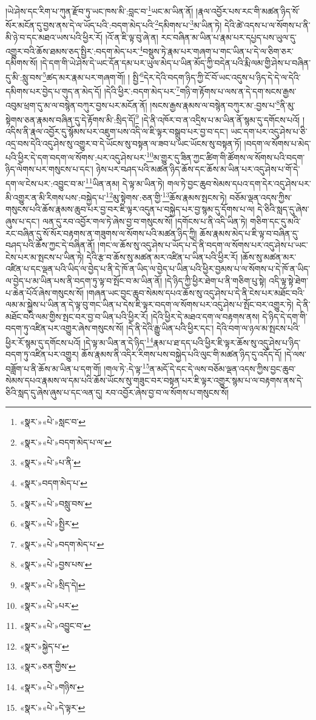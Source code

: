 །ཡེ་ཤེས་དང་རིག་པ་ཀུན་རྫོབ་ཏུ་ཡང་ཁས་མི་:བླང་བ་\footnote{«སྣར་»«པེ་»སླང་བ་}ཡང་མ་ཡིན་ནོ། །རྣལ་འབྱོར་པས་རང་གི་མཚན་ཉིད་སོ་སོར་མངོན་དུ་བྱས་ནས་དེ་ལ་ཡོད་པའི་:བདག་མེད་པའི་\footnote{«སྣར་»«པེ་»བདག་མེད་པ་ལ་}དམིགས་པ་\footnote{«སྣར་»«པེ་»པ་ནི་}མ་ཡིན་ཏེ། དེའི་ཚེ་འདས་པ་ལ་སོགས་པ་ནི་མི་ཉེ་བ་དང་མཐའ་ཡས་པའི་ཕྱིར་རོ། །འོ་ན་ཇི་ལྟ་བུ་ཞེ་ན། རང་བཞིན་མ་ཡིན་པ་རྣམ་པར་དཔྱད་པས་ཡུལ་དུ་འགྱུར་བའི་ཆོས་ཐམས་ཅད་སྤྱིར་:བདག་མེད་པར་\footnote{«སྣར་»བདག་མེད་པ་}བསྡུས་ཏེ་རྣམ་པར་གཞག་པ་གང་ཡིན་པ་དེ་ལ་ཅིག་ཅར་དམིགས་སོ། །དེ་དག་གི་ཡེ་ཤེས་དེ་ཡང་དོན་དམ་པར་ཡུལ་མེད་པ་ཡིན་མོད་ཀྱི་བདེན་པའི་རྨི་ལམ་གྱི་ཤེས་པ་བཞིན་དུ་མི་:སླུ་བས་\footnote{«སྣར་»«པེ་»བསླུ་བས་}ཚད་མར་རྣམ་པར་གཞག་གོ། །
སྤྱི་\footnote{«སྣར་»«པེ་»སྤྱིར་}དེར་དེའི་བདག་ཉིད་ཀྱི་ངོ་བོ་ཡང་འདུས་པ་ཉིད་དེ་དེ་ལ་དེའི་དམིགས་པར་བྱེད་པ་གུད་ན་མེད་དོ། །དེའི་ཕྱིར་:བདག་མེད་པར་\footnote{«སྣར་»«པེ་»བདག་མེད་པ་}གཉི་ག་རྟོགས་པ་ལས་ན་དེ་དག་སངས་རྒྱས་འབུམ་ཕྲག་དུ་མ་ལ་བསྙེན་བཀུར་བྱས་པར་མངོན་ནོ། །སངས་རྒྱས་རྣམས་ལ་བསྙེན་བཀུར་མ་:བྱས་པ་\footnote{«སྣར་»«པེ་»བྱས་པས་}ནི་མུ་སྟེགས་ཅན་རྣམས་བཞིན་དུ་དེ་རྟོགས་མི་:སྲིད་དོ།\footnote{«སྣར་»«པེ་»སྲིད་དེ།} །དེ་ནི་འཁོར་བ་ན་འདྲིས་པ་མ་ཡིན་ནོ་སྙམ་དུ་དགོངས་པའོ། །འདིས་ནི་རྣལ་འབྱོར་དུ་སྙོམས་པར་འཇུག་པས་འདི་ལ་ཇི་ལྟར་བསྒྲུབ་པར་བྱ་བ་དང་། ཡང་དག་པར་འདུ་ཤེས་པ་ཅི་འདྲ་བས་དེའི་འདུ་ཤེས་སུ་འགྱུར་བ་དེ་ཡོངས་སུ་བསྟན་ལ་ཟབ་པ་ཡང་ཡོངས་སུ་བསྟན་ཏོ། །བདག་ལ་སོགས་པ་མེད་པའི་ཕྱིར་དེ་དག་བདག་ལ་སོགས་:པར་འདུ་ཤེས་པར་\footnote{«སྣར་»«པེ་»པར་}མ་གྱུར་དུ་ཟིན་ཀྱང་ཚིག་གི་ཚོགས་ལ་སོགས་པའི་བདག་ཉིད་ལེགས་པར་གསུངས་པ་དང་། ཉེས་པར་བཤད་པའི་མཚན་ཉིད་ཆོས་དང་ཆོས་མ་ཡིན་པར་འདུ་ཤེས་པ་གོ་དེ་དག་ལ་ངེས་པར་:འབྱུང་བ་མ་\footnote{«སྣར་»«པེ་»འབྱུང་བ་}ཡིན་ནམ། དེ་ལྟ་མ་ཡིན་ཏེ། གལ་ཏེ་བྱང་ཆུབ་སེམས་དཔའ་དག་དེར་འདུ་ཤེས་པར་མི་འགྱུར་ན་མི་རིགས་པས་:བསྐྱེད་པ་\footnote{«སྣར་»སྐྱེད་པ་}མུ་སྟེགས་:ཅན་གྱི་\footnote{«སྣར་»ཅན་གྱིས་}ཆོས་རྣམས་སྤངས་ཏེ། བཅོམ་ལྡན་འདས་ཀྱིས་གསུངས་པའི་ཆོས་རྣམས་ཆུབ་པར་བྱ་བར་ཇི་ལྟར་འདུན་པ་བསྐྱེད་པར་བྱ་སྙམ་དུ་དོགས་པ་ལ། དེ་ཅིའི་སླད་དུ་ཞེས་ཞུས་པ་དང་། ལན་དུ་རབ་འབྱོར་གལ་ཏེ་ཞེས་བྱ་བ་གསུངས་སོ། །དགོངས་པ་ནི་འདི་ཡིན་ཏེ། གཅིག་དང་དུ་མའི་རང་བཞིན་དུ་སོ་སོར་བརྟགས་ན་གཟུགས་ལ་སོགས་པའི་མཚན་ཉིད་ཀྱི། ཆོས་རྣམས་མེད་པ་ཇི་ལྟ་བ་བཞིན་དུ་བཤད་པའི་ཆོས་ཀྱང་དེ་བཞིན་ནོ། །གང་ལ་ཆོས་སུ་འདུ་ཤེས་པ་ཡོད་པ་དེ་ནི་བདག་ལ་སོགས་པར་འདུ་ཤེས་པ་ཡང་ངེས་པར་མ་སྤངས་པ་ཡིན་ཏེ། དེའི་རྩ་བ་ཆོས་སུ་མཚན་མར་འཛིན་པ་ཡིན་པའི་ཕྱིར་རོ། །ཆོས་སུ་མཚན་མར་འཛིན་པ་དང་ལྡན་པའི་ཡིད་ལ་བྱེད་པ་ནི་དེ་ཁོ་ན་ཡིད་ལ་བྱེད་པ་ཡིན་པའི་ཕྱིར་བྱམས་པ་ལ་སོགས་པ་དེ་ཁོ་ན་ཡིད་ལ་བྱེད་པ་མ་ཡིན་པས་ནི་བདག་ཏུ་ལྟ་བ་སྤོང་བ་མ་ཡིན་ནོ། །དེ་ཉིད་ཀྱི་ཕྱིར་ཐེག་པ་ནི་གཅིག་པུ་སྟེ། འདི་ལྟ་སྟེ་ཐེག་པ་ཆེན་པོའོ་ཞེས་གསུངས་སོ། །གཞན་ཡང་བྱང་ཆུབ་སེམས་དཔའ་ཆོས་སུ་འདུ་ཤེས་པ་དེ་ནི་ངེས་པར་མཐོང་བའི་ལམ་མ་སྐྱེས་པ་ཡིན་ན་དེ་ལྟ་བུ་གང་ཡིན་པ་དེས་ཇི་ལྟར་བདག་ལ་སོགས་པར་འདུ་ཤེས་པ་སྤོང་བར་འགྱུར་ཏེ། དེ་ནི་མཐོང་བའི་ལམ་གྱིས་སྤང་བར་བྱ་བ་ཡིན་པའི་ཕྱིར་རོ། །དེའི་ཕྱིར་དེ་མཐའ་དག་ལ་བརྟགས་ནས། དེ་ཉིད་དེ་དག་གི་བདག་ཏུ་འཛིན་པར་འགྱུར་ཞེས་གསུངས་སོ། །དེ་ནི་དེའི་རྒྱུ་ཡིན་པའི་ཕྱིར་དང་། དེའི་བག་ལ་ཉལ་མ་སྤངས་པའི་ཕྱིར་རོ་སྙམ་དུ་དགོངས་པའོ། །དེ་ལྟ་མ་ཡིན་ན་དེ་ཉིད་\footnote{«སྣར་»«པེ་»གཉིས་}རྣམ་པ་ཐ་དད་པའི་ཕྱིར་ཇི་ལྟར་ཆོས་སུ་འདུ་ཤེས་པ་ཉིད་བདག་ཏུ་འཛིན་པར་འགྱུར། ཆོས་རྣམས་ནི་འདིར་རིགས་པས་བསྐྱེད་པའི་ལུང་གི་མཚན་ཉིད་དུ་འདོད་དོ། །དེ་ལས་བཟློག་པ་ནི་ཆོས་མ་ཡིན་པ་དག་གོ། །གལ་ཏེ་:དེ་ལྟ་\footnote{«སྣར་»«པེ་»དེ་ལྟར་}ན་མདོ་དེ་དང་དེ་ལས་བཅོམ་ལྡན་འདས་ཀྱིས་བྱང་ཆུབ་སེམས་དཔའ་རྣམས་ལ་དམ་པའི་ཆོས་ཡོངས་སུ་གཟུང་བར་བསྟན་པར་ཇི་ལྟར་འགྱུར་སྙམ་པ་ལ་བརྟགས་ནས་དེ་ཅིའི་སླད་དུ་ཞེས་ཞུས་པ་དང་ལན་དུ། རབ་འབྱོར་ཞེས་བྱ་བ་ལ་སོགས་པ་གསུངས་སོ། 